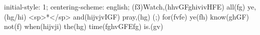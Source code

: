 initial-style: 1;
centering-scheme: english;
(f3)Watch,(hhvGFghivivHFE) all(fg) ye,(hg/hi) <sp>*</sp> and(hijvjvIGF) pray,(hg) (;) for(fvfe) ye(fh) know(ghGF) not(f) when(hijvji) the(hg) time(fghvGFEfg) is.(gv)
